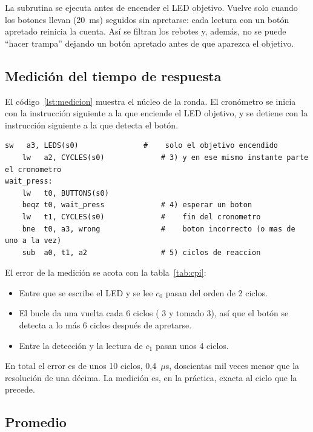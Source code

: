 La subrutina  se ejecuta antes de encender el LED objetivo. Vuelve
solo cuando los botones llevan  (20~ms) seguidos sin apretarse:
cada lectura con un botón apretado reinicia la cuenta. Así se filtran los rebotes y,
además, no se puede ``hacer trampa'' dejando un botón apretado antes de que aparezca el
objetivo.

\subsection{Medición del tiempo de respuesta}

El código~\ref{lst:medicion} muestra el núcleo de la ronda. El cronómetro se inicia
con la instrucción siguiente a la que enciende el LED objetivo, y se detiene con la
instrucción siguiente a la que detecta el botón.

\begin{lstlisting}[language=rvasm, caption={Encendido del objetivo y medición.}, label={lst:medicion}]
    sw   a3, LEDS(s0)               #    solo el objetivo encendido
    lw   a2, CYCLES(s0)             # 3) y en ese mismo instante parte el cronometro
wait_press:
    lw   t0, BUTTONS(s0)
    beqz t0, wait_press             # 4) esperar un boton
    lw   t1, CYCLES(s0)             #    fin del cronometro
    bne  t0, a3, wrong              #    boton incorrecto (o mas de uno a la vez)
    sub  a0, t1, a2                 # 5) ciclos de reaccion
\end{lstlisting}

El error de la medición se acota con la tabla~\ref{tab:cpi}:

\begin{itemize}
  \item Entre que se escribe el LED y se lee $c_0$ pasan del orden de 2 ciclos.
  \item El bucle  da una vuelta cada 6 ciclos ( 3 y
         tomado 3), así que el botón se detecta a lo más 6 ciclos después de
        apretarse.
  \item Entre la detección y la lectura de $c_1$ pasan unos 4 ciclos.
\end{itemize}

En total el error es de unos 10 ciclos, 0,4~$\mu$s, doscientas mil veces menor que la
resolución de una décima. La medición es, en la práctica, exacta al ciclo que la
precede.

\subsection{Promedio}
\label{sec:promedio}

